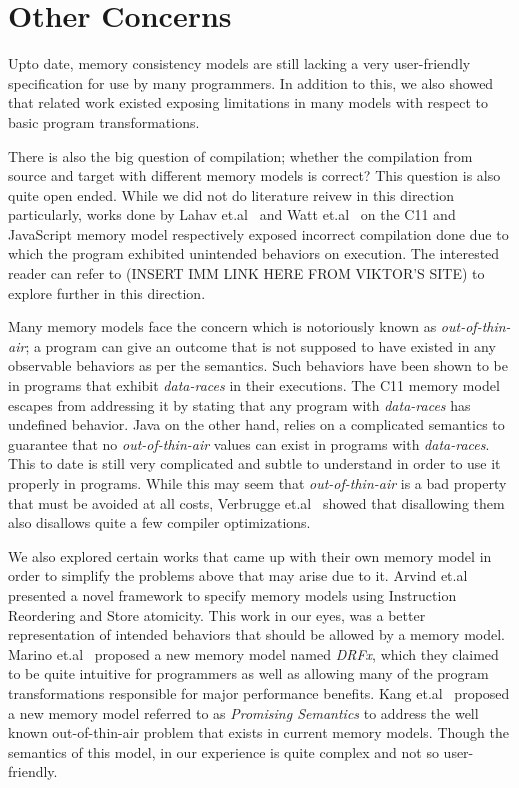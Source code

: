 \section{Other Concerns}

    Upto date, memory consistency models are still lacking a very user-friendly specification for use by many programmers. 
    In addition to this, we also showed that related work existed exposing limitations in many models with respect to basic program transformations.
    
    There is also the big question of compilation; whether the compilation from source and target with different memory models is correct? This question is also quite open ended. While we did not do literature reivew in this direction particularly, works done by Lahav et.al~\cite{Lahav} and Watt et.al~\cite{Watt} on the C11 and JavaScript memory model respectively exposed incorrect compilation done due to which the program exhibited unintended behaviors on execution. 
    The interested reader can refer to (INSERT IMM LINK HERE FROM VIKTOR'S SITE) to explore further in this direction.
    
    Many memory models face the concern which is notoriously known as \textit{out-of-thin-air}; a program can give an outcome that is not supposed to have existed in any observable behaviors as per the semantics. %
    Such behaviors have been shown to be in programs that exhibit \textit{data-races} in their executions.
    The C11 memory model escapes from addressing it by stating that any program with \textit{data-races} has undefined behavior.
    Java on the other hand, relies on a complicated semantics to guarantee that no \textit{out-of-thin-air} values can exist in programs with \textit{data-races}. This to date is still very complicated and subtle to understand in order to use it properly in programs. 
    While this may seem that \textit{out-of-thin-air} is a bad property that must be avoided at all costs, Verbrugge et.al~\cite{Verbrugge} showed that disallowing them also disallows quite a few compiler optimizations.

    We also explored certain works that came up with their own memory model in order to simplify the problems above that may arise due to it. 
    Arvind et.al~\cite{Arvind} presented a novel framework to specify memory models using Instruction Reordering and Store atomicity. This work in our eyes, was a better representation of intended behaviors that should be allowed by a memory model. 
    Marino et.al~\cite{Marino} proposed a new memory model named \textit{DRFx}, which they claimed to be quite intuitive for programmers as well as allowing many of the program transformations responsible for major performance benefits.
    Kang et.al~\cite{Kang} proposed a new memory model referred to as \textit{Promising Semantics} to address the well known out-of-thin-air problem that exists in current memory models. Though the semantics of this model, in our experience is quite complex and not so user-friendly.
